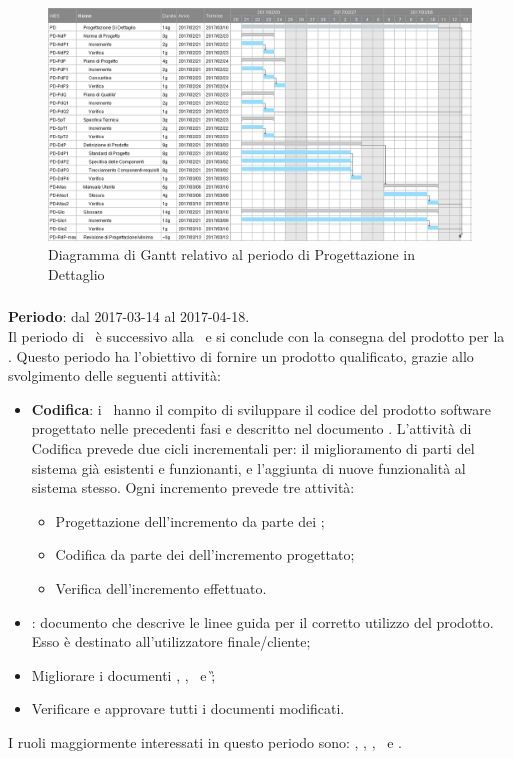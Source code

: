		\begin{figure}[ht]
			\centering
			\includegraphics[scale=0.35]{img/ganttnetbreak3.png}
			\caption{Diagramma di Gantt relativo al periodo di Progettazione in Dettaglio}
		\end{figure}
		\FloatBarrier
		
		\subsubsection{\CO}
		\textbf{Periodo}: dal 2017-03-14 al 2017-04-18.\\
		Il periodo di \CO\ è successivo alla \PD\ e si conclude con la consegna	del prodotto per la \RQ. Questo periodo ha l'obiettivo di fornire un prodotto qualificato, grazie allo svolgimento delle seguenti attività:
		\begin{itemize}
			\item \textbf{Codifica}: i \Progrs\ hanno il compito di sviluppare il codice del prodotto software progettato nelle precedenti fasi e descritto nel documento \DDP. L’attività di Codifica prevede due cicli incrementali per: il miglioramento
			di parti del sistema già esistenti e funzionanti, e l’aggiunta di nuove funzionalità al sistema stesso.
			Ogni incremento prevede tre attività:
			\begin{itemize}
				\item Progettazione dell’incremento da parte dei \Progs;
				\item Codifica da parte dei \Progrs dell’incremento progettato;
				\item Verifica dell’incremento effettuato.
			\end{itemize}
			\item \textit{\MU}: documento che descrive le linee guida per il corretto utilizzo del prodotto. Esso è destinato all’utilizzatore finale/cliente;
			\item  Migliorare i documenti \NdP, \PdP, \PdQ\ e \G;
			\item Verificare e approvare tutti i documenti modificati.
		\end{itemize}
		I ruoli maggiormente interessati in questo periodo sono: \Amm, \Res, \Prog, \Progr\ e \Ver.
		
